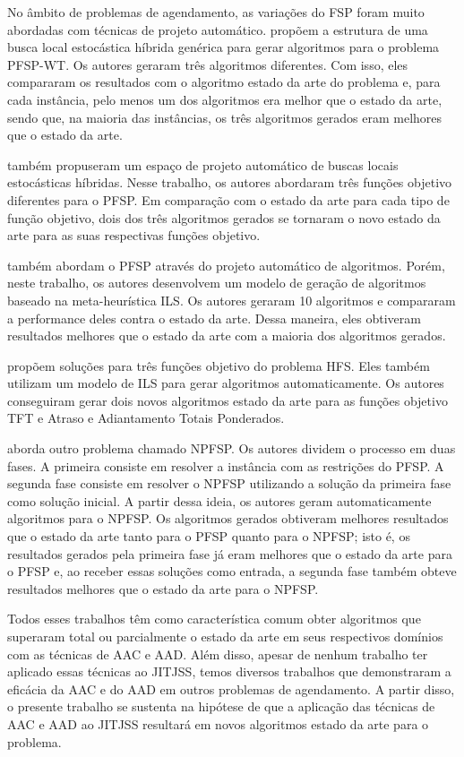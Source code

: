 No âmbito de problemas de agendamento, as variações do \ac{FSP} foram muito abordadas com técnicas de projeto automático. \cite{marmion2013automatic} propõem a estrutura de uma busca local estocástica híbrida genérica para gerar algoritmos para o problema \ac{PFSP-WT}. Os autores geraram três algoritmos diferentes. Com isso, eles compararam os resultados com o algoritmo estado da arte do problema e, para cada instância, pelo menos um dos algoritmos era melhor que o estado da arte, sendo que, na maioria das instâncias, os três algoritmos gerados eram melhores que o estado da arte.

\cite{pagnozzi2019automatic} também propuseram um espaço de projeto automático de buscas locais estocásticas híbridas. Nesse trabalho, os autores abordaram três funções objetivo diferentes para o \ac{PFSP}. Em comparação com o estado da arte para cada tipo de função objetivo, dois dos três algoritmos gerados se tornaram o novo estado da arte para as suas respectivas funções objetivo.

\cite{brum2018automatic} também abordam o \ac{PFSP} através do projeto automático de algoritmos. Porém, neste trabalho, os autores desenvolvem um modelo de geração de algoritmos baseado na meta-heurística \ac{ILS}. Os autores geraram 10 algoritmos e compararam a performance deles contra o estado da arte. Dessa maneira, eles obtiveram resultados melhores que o estado da arte com a maioria dos algoritmos gerados.

\cite{alfaro2020automatic} propõem soluções para três funções objetivo do problema \ac{HFS}. Eles também utilizam um modelo de \ac{ILS} para gerar algoritmos automaticamente. Os autores conseguiram gerar dois novos algoritmos estado da arte para as funções objetivo \ac{TFT} e Atraso e Adiantamento Totais Ponderados.

\cite{brum2022automatic} aborda outro problema chamado \ac{NPFSP}. Os autores dividem o processo em duas fases. A primeira consiste em resolver a instância com as restrições do \ac{PFSP}. A segunda fase consiste em resolver o \ac{NPFSP} utilizando a solução da primeira fase como solução inicial. A partir dessa ideia, os autores geram automaticamente algoritmos para o \ac{NPFSP}. Os algoritmos gerados obtiveram melhores resultados que o estado da arte tanto para o \ac{PFSP} quanto para o \ac{NPFSP}; isto é, os resultados gerados pela primeira fase já eram melhores que o estado da arte para o \ac{PFSP} e, ao receber essas soluções como entrada, a segunda fase também obteve resultados melhores que o estado da arte para o \ac{NPFSP}.

Todos esses trabalhos têm como característica comum obter algoritmos que superaram total ou parcialmente o estado da arte em seus respectivos domínios com as técnicas de \ac{AAC} e \ac{AAD}. Além disso, apesar de nenhum trabalho ter aplicado essas técnicas ao \ac{JITJSS}, temos diversos trabalhos que demonstraram a eficácia da \ac{AAC} e do \ac{AAD} em outros problemas de agendamento. A partir disso, o presente trabalho se sustenta na hipótese de que a aplicação das técnicas de \ac{AAC} e \ac{AAD} ao \ac{JITJSS} resultará em novos algoritmos estado da arte para o problema. 
